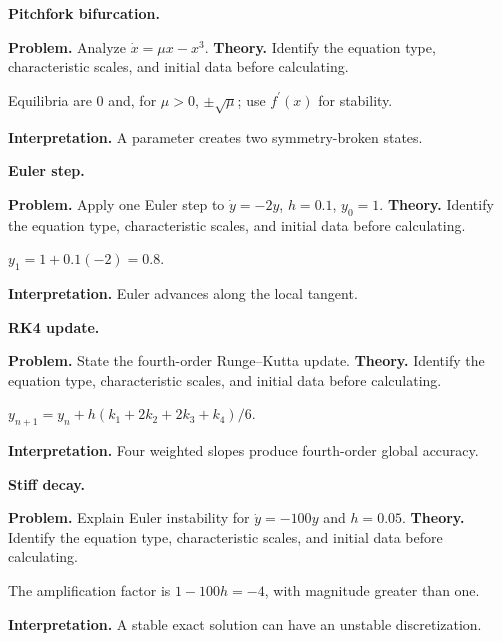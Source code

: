 \begin{workedexample}
\textbf{Pitchfork bifurcation.}\par
\textbf{Problem.} Analyze $\dot x=\mu x-x^3$.
\textbf{Theory.} Identify the equation type, characteristic scales, and initial data before calculating.
\begin{solution}
Equilibria are $0$ and, for $\mu>0$, $\pm\sqrt\mu$; use $f^{\prime}(x)$ for stability.

\textbf{Interpretation.} A parameter creates two symmetry-broken states.
\end{solution}
\end{workedexample}

\begin{workedexample}
\textbf{Euler step.}\par
\textbf{Problem.} Apply one Euler step to $\dot y=-2y$, $h=0.1$, $y_0=1$.
\textbf{Theory.} Identify the equation type, characteristic scales, and initial data before calculating.
\begin{solution}
$y_1=1+0.1(-2)=0.8$.

\textbf{Interpretation.} Euler advances along the local tangent.
\end{solution}
\end{workedexample}

\begin{workedexample}
\textbf{RK4 update.}\par
\textbf{Problem.} State the fourth-order Runge--Kutta update.
\textbf{Theory.} Identify the equation type, characteristic scales, and initial data before calculating.
\begin{solution}
$y_{n+1}=y_n+h(k_1+2k_2+2k_3+k_4)/6$.

\textbf{Interpretation.} Four weighted slopes produce fourth-order global accuracy.
\end{solution}
\end{workedexample}

\begin{workedexample}
\textbf{Stiff decay.}\par
\textbf{Problem.} Explain Euler instability for $\dot y=-100y$ and $h=0.05$.
\textbf{Theory.} Identify the equation type, characteristic scales, and initial data before calculating.
\begin{solution}
The amplification factor is $1-100h=-4$, with magnitude greater than one.

\textbf{Interpretation.} A stable exact solution can have an unstable discretization.
\end{solution}
\end{workedexample}

